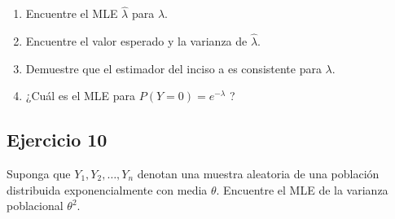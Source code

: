 \documentclass[
]{article}
\providecommand{\tightlist}{%
  \setlength{\itemsep}{0pt}\setlength{\parskip}{0pt}}
\begin{document}
\begin{enumerate}
\def\labelenumi{\alph{enumi}.}
\tightlist
\item
  Encuentre el MLE \(\hat{\lambda}\) para \(\lambda\).
\item
  Encuentre el valor esperado y la varianza de \(\hat{\lambda}\).
\item
  Demuestre que el estimador del inciso a es consistente para \(\lambda\).
\item
  ¿Cuál es el MLE para \(P(Y=0)=e^{-\lambda}\) ?
\end{enumerate}

\subsection{Ejercicio 10}\label{ejercicio-10-1}

Suponga que \(Y_{1}, Y_{2}, \ldots, Y_{n}\) denotan una muestra aleatoria de una población distribuida exponencialmente con media \(\theta\). Encuentre el MLE de la varianza poblacional \(\theta^{2}\).
\end{document}
